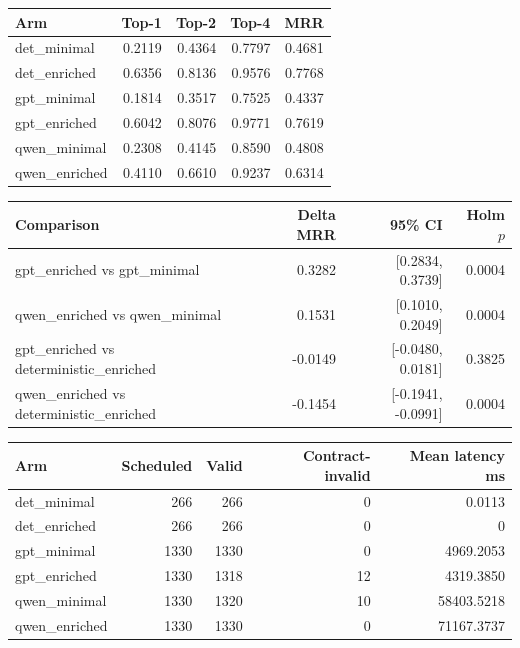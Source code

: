 \begin{tabular}{lrrrr}
\toprule
Arm & Top-1 & Top-2 & Top-4 & MRR \\
\midrule
det\_minimal & 0.2119 & 0.4364 & 0.7797 & 0.4681 \\
det\_enriched & 0.6356 & 0.8136 & 0.9576 & 0.7768 \\
gpt\_minimal & 0.1814 & 0.3517 & 0.7525 & 0.4337 \\
gpt\_enriched & 0.6042 & 0.8076 & 0.9771 & 0.7619 \\
qwen\_minimal & 0.2308 & 0.4145 & 0.8590 & 0.4808 \\
qwen\_enriched & 0.4110 & 0.6610 & 0.9237 & 0.6314 \\
\bottomrule
\end{tabular}

\begin{tabular}{lrrr}
\toprule
Comparison & Delta MRR & 95\% CI & Holm $p$ \\
\midrule
gpt\_enriched vs gpt\_minimal & 0.3282 & [0.2834, 0.3739] & 0.0004 \\
qwen\_enriched vs qwen\_minimal & 0.1531 & [0.1010, 0.2049] & 0.0004 \\
gpt\_enriched vs deterministic\_enriched & -0.0149 & [-0.0480, 0.0181] & 0.3825 \\
qwen\_enriched vs deterministic\_enriched & -0.1454 & [-0.1941, -0.0991] & 0.0004 \\
\bottomrule
\end{tabular}

\begin{tabular}{lrrrr}
\toprule
Arm & Scheduled & Valid & Contract-invalid & Mean latency ms \\
\midrule
det\_minimal & 266 & 266 & 0 & 0.0113 \\
det\_enriched & 266 & 266 & 0 & 0 \\
gpt\_minimal & 1330 & 1330 & 0 & 4969.2053 \\
gpt\_enriched & 1330 & 1318 & 12 & 4319.3850 \\
qwen\_minimal & 1330 & 1320 & 10 & 58403.5218 \\
qwen\_enriched & 1330 & 1330 & 0 & 71167.3737 \\
\bottomrule
\end{tabular}
